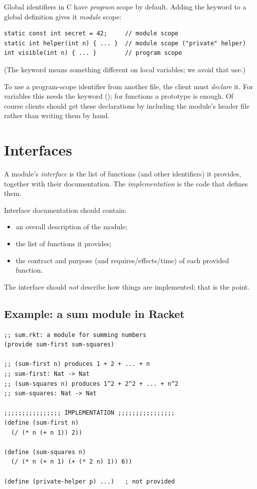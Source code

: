 \begin{important}[Scope in C]
Global identifiers in C have \emph{program} scope by default. Adding the keyword
 to a global definition gives it \emph{module} scope:
\begin{lstlisting}[style=c]
static const int secret = 42;     // module scope
static int helper(int n) { ... }  // module scope ("private" helper)
int visible(int n) { ... }        // program scope
\end{lstlisting}
(The keyword  means something different on local variables; we avoid that use.)
\end{important}

To use a program-scope identifier from another file, the client must \emph{declare} it.
For variables this needs the keyword  (); for functions
a prototype is enough. Of course clients should get these declarations by including the
module's header file rather than writing them by hand.

\section{Interfaces}

\begin{definition}
A module's \emph{interface} is the list of functions (and other identifiers) it provides,
together with their documentation. The \emph{implementation} is the code that defines them.
\end{definition}

Interface documentation should contain:
\begin{itemize}
  \item an overall description of the module;
  \item the list of functions it provides;
  \item the contract and purpose (and requires/effects/time) of each provided function.
\end{itemize}
The interface should \emph{not} describe how things are implemented; that is the point.

\subsection{Example: a sum module in Racket}
\begin{lstlisting}[style=racket]
;; sum.rkt: a module for summing numbers
(provide sum-first sum-squares)

;; (sum-first n) produces 1 + 2 + ... + n
;; sum-first: Nat -> Nat
;; (sum-squares n) produces 1^2 + 2^2 + ... + n^2
;; sum-squares: Nat -> Nat

;;;;;;;;;;;;;;;; IMPLEMENTATION ;;;;;;;;;;;;;;;;
(define (sum-first n)
  (/ (* n (+ n 1)) 2))

(define (sum-squares n)
  (/ (* n (+ n 1) (+ (* 2 n) 1)) 6))

(define (private-helper p) ...)   ; not provided
\end{lstlisting}

